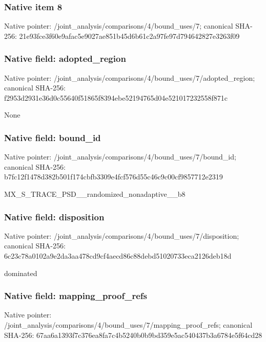 \documentclass[10pt,a4paper]{article}
\begin{document}
\subsubsection{Native item 8}
Native pointer: /joint\_\allowbreak{}analysis/comparisons/4/bound\_\allowbreak{}uses/7; canonical SHA-256: 21e93fce3f60e9afac5e9027ae851b45d6b61c2a97fe97d794642827e3263f09

\subsubsection{Native field: adopted\_\allowbreak{}region}
Native pointer: /joint\_\allowbreak{}analysis/comparisons/4/bound\_\allowbreak{}uses/7/adopted\_\allowbreak{}region; canonical SHA-256: f2953d2931e36d0c55640f51865f8394ebe52194765d04e521017232558f871c

\begingroup\raggedright\sloppy None\par\endgroup

\subsubsection{Native field: bound\_\allowbreak{}id}
Native pointer: /joint\_\allowbreak{}analysis/comparisons/4/bound\_\allowbreak{}uses/7/bound\_\allowbreak{}id; canonical SHA-256: b7fc12f1478d382b501f174cbfb3309e4fcf576d55c46c9c00cf9857712e2319

\begingroup\raggedright\sloppy MX\_\allowbreak{}S\_\allowbreak{}TRACE\_\allowbreak{}PSD\_\allowbreak{}\_\allowbreak{}randomized\_\allowbreak{}nonadaptive\_\allowbreak{}\_\allowbreak{}b8\par\endgroup

\subsubsection{Native field: disposition}
Native pointer: /joint\_\allowbreak{}analysis/comparisons/4/bound\_\allowbreak{}uses/7/disposition; canonical SHA-256: 6c23c78a0102a9e2da3aa478cd9cf4aecd86c88debd51020733eca2126deb18d

\begingroup\raggedright\sloppy dominated\par\endgroup

\subsubsection{Native field: mapping\_\allowbreak{}proof\_\allowbreak{}refs}
Native pointer: /joint\_\allowbreak{}analysis/comparisons/4/bound\_\allowbreak{}uses/7/mapping\_\allowbreak{}proof\_\allowbreak{}refs; canonical SHA-256: 67aa6a1393f7c376ea8fa7c4b5240b0b9bd359e5ac540437b3a6784e5f64cd28
\end{document}
